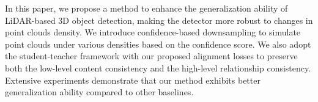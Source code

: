 \label{conclusion}

In this paper, we propose a method to enhance the generalization ability of LiDAR-based 3D object detection, making the detector more robust to changes in point clouds density. We introduce confidence-based downsampling to simulate point clouds under various densities based on the confidence score. We also adopt the student-teacher framework with our proposed alignment losses to preserve both the low-level content consistency and the high-level relationship consistency. Extensive experiments demonstrate that our method exhibits better generalization ability compared to other baselines.